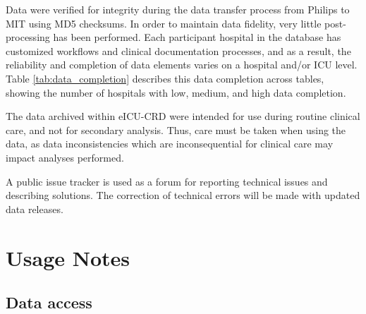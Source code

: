 \documentclass[english]{article}
\begin{document}
Data were verified for integrity during the data transfer process from
Philips to MIT using MD5 checksums.
In order to maintain data fidelity, very little post-processing has been performed.
Each participant hospital in the database has customized
workflows and clinical documentation processes, and as a result, the
reliability and completion of data elements varies on a hospital and/or
ICU level.
Table \ref{tab:data_completion} describes this data completion across tables, showing the number of hospitals with low, medium, and high data completion.

The data archived within eICU-CRD were intended for use during routine clinical care, and not for secondary analysis. Thus, care must be taken when using the data, as data inconsistencies which are inconsequential for clinical care may impact analyses performed.

A public issue tracker is used as a forum for reporting technical issues
and describing solutions. The correction of
technical errors will be made with updated data releases.

\section*{Usage Notes}\label{usage-notes}



\subsection*{Data access}\label{data-access}
\end{document}
